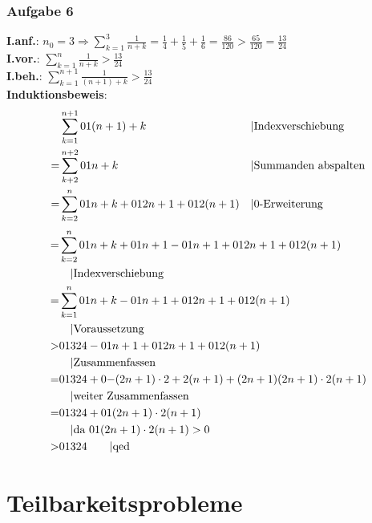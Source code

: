 \subsubsection{Aufgabe 6}
\textbf{I.anf.}: $ n_0 = 3 \Rightarrow   \sum_{k=1}^3 \frac{1}{n+k} = \frac{1}{4} + \frac{1}{5} + \frac{1}{6} = \frac{86}{120}>\frac{65}{120}=\frac{13}{24} $\\
\textbf{I.vor.}: $\sum_{k=1}^n \frac{1}{n+k} > \frac{13}{24} $\\
\textbf{I.beh.}: $\sum_{k=1}^{n+1} \frac{1}{(n+1)+k} > \frac{13}{24} $\\
\textbf{Induktionsbeweis}: \begin{align*}
&\sum_{k=1}^{n+1} \frac{1}{(n+1)+k} && \text{\textbar Indexverschiebung}\\
= &\sum_{k+2}^{n+2} \frac{1}{n+k}								&& \text{\textbar Summanden abspalten}\\
= &\sum_{k=2}^n \frac{1}{n+k} + \frac{1}{2n + 1} + \frac{1}{2(n+1)} 				&& \text{\textbar 0-Erweiterung}\end{align*}	
\begin{align*}
= &\sum_{k=2}^n \frac{1}{n+k} + \frac{1}{n+1} - \frac{1}{n+1} + \frac{1}{2n + 1} + \frac{1}{2(n+1)} \\
	&\quad \text{\textbar Indexverschiebung}\\
= &\sum_{k=1}^n \frac{1}{n+k} - \frac{1}{n+1} + \frac{1}{2n + 1} + \frac{1}{2(n+1)} \\
	&\quad \text{\textbar Voraussetzung}\\
> &\frac{13}{24} - \frac{1}{n+1} + \frac{1}{2n + 1} + \frac{1}{2(n+1)} 							\\
	&\quad \text{\textbar Zusammenfassen}\\
= &\frac{13}{24} + \frac{-(2n+1) \cdot 2 + 2(n+1) + (2n+1)}{(2n+1) \cdot 2(n+1)} 		\\
	&\quad \text{\textbar weiter Zusammenfassen}\\
= &\frac{13}{24} + \frac{1}{(2n+1) \cdot 2(n+1)} 																	\\
	&\quad  \text{\textbar da $\frac{1}{(2n+1) \cdot 2(n+1)} > 0$}\\
> &\frac{13}{24} 	\qquad \text{\textbar qed}\end{align*}		
\section{Teilbarkeitsprobleme}
